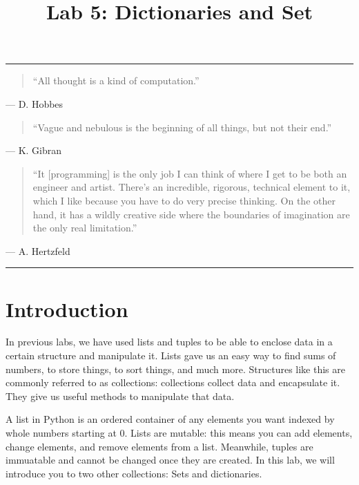 \documentclass[11pt]{cselabheader}
\title{Lab 5: Dictionaries and Set}
\begin{document}
\maketitle

\hrule
\begin{quotation}
``All thought is a kind of computation.''
\end{quotation}
\begin{flushright}
--- D. Hobbes
\end{flushright}

\begin{quotation}
``Vague and nebulous is the beginning of all things, but not their end.''
\end{quotation}
\begin{flushright}
--- K. Gibran
\end{flushright}

\begin{quotation}
``It [programming] is the only job I can think of where I get to be both an
engineer and artist. There's an incredible, rigorous, technical element to it,
which I like because you have to do very precise thinking. On the other hand, it
has a wildly creative side where the boundaries of imagination are the only real
limitation.''
\end{quotation}
\begin{flushright}
--- A. Hertzfeld
\end{flushright}

\hrule

\section{Introduction}

In previous labs, we have used lists and tuples to be able to enclose data
in a certain
structure and manipulate it. Lists gave us an easy way to find sums of numbers,
to store things, to sort things, and much more. Structures like this are
commonly referred to as collections: collections collect data and encapsulate
it. They give us useful methods to manipulate that data.

A list in Python is an ordered container of any elements you want indexed by
whole numbers starting at 0. Lists are mutable: this means you can add elements,
change elements, and remove elements from a list. Meanwhile, tuples are immuatable
and cannot be changed once they are created.
In this lab, we will introduce you to two other collections: Sets and dictionaries.
\end{document}
